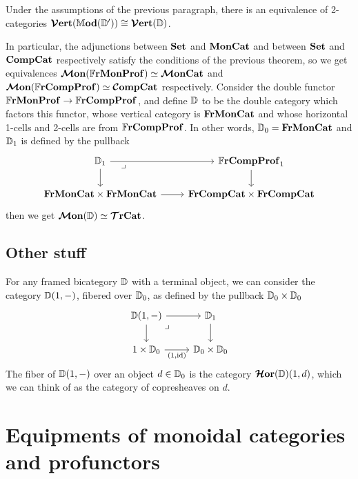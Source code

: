 \documentclass[12pt,oneside,article,draft]{memoir}
\begin{document}
\begin{theorem}\label{thm:Verts}
   Under the assumptions of the previous paragraph, there is an equivalence of 2-categories
   $\bm{\mathcal{V}}\mathbf{ert}(\mathbb{M}\mathbf{od}(\mathbb{D}'))\cong\bm{\mathcal{V}}\mathbf{ert}(\mathbb{D})$.
\end{theorem}

In particular, the adjunctions between $\mathbf{Set}$ and $\mathbf{MonCat}$ and between $\mathbf{Set}$ and $\mathbf{CompCat}$
respectively satisfy the conditions of the previous theorem, so we get equivalences
$\bm{\mathcal{M}}\mathbf{on}(\mathbb{F}\mathbf{rMonProf})\simeq\bm{\mathcal{M}}\mathbf{onCat}$ and $\bm{\mathcal{M}}\mathbf{on}(\mathbb{F}\mathbf{rCompProf})\simeq\bm{\mathcal{C}}\mathbf{ompCat}$ respectively.  Consider
the double functor $\mathbb{F}\mathbf{rMonProf}\to\mathbb{F}\mathbf{rCompProf}$, and define $\mathbb{D}$ to be the double category
which factors this functor, whose vertical category is $\mathbf{FrMonCat}$ and whose horizontal 1-cells and
2-cells are from $\mathbb{F}\mathbf{rCompProf}$.  In other words, $\mathbb{D}_0=\mathbf{FrMonCat}$ and $\mathbb{D}_1$ is defined
by the pullback
\[
   \begin{tikzcd}
      \dcat{D}_1 \ar[r] \ar[d] \ar[dr,phantom,"\lrcorner"very near start]
      & \dFrCompProf_1 \ar[d]
      \\
      \FrMonCat\times\FrMonCat \ar[r]
      & \FrCompCat\times\FrCompCat
   \end{tikzcd}
\]
then we get $\bm{\mathcal{M}}\mathbf{on}(\mathbb{D})\simeq\bm{\mathcal{T}}\mathbf{rCat}$.

\section{Other stuff}

For any framed bicategory $\mathbb{D}$ with a terminal object, we can consider the category
$\mathbb{D}(1,-)$, fibered over $\mathbb{D}_0$, as defined by the pullback $\mathbb{D}_0\times\mathbb{D}_0$
\begin{equation}
   \begin{tikzcd}
      \dcat{D}(1,-) \ar[r] \ar[d] \arrow[dr,phantom,"\lrcorner",very near start]
         & \dcat{D}_1 \ar[d] \\
      1\times\dcat{D}_0 \ar[r,"{(1,\id)}"']
         & \dcat{D}_0\times\dcat{D}_0
   \end{tikzcd}
\end{equation}
The fiber of $\mathbb{D}(1,-)$ over an object $d\in\mathbb{D}_0$ is the category $\bm{\mathcal{H}}\mathbf{or}(\mathbb{D})(1,d)$,
which we can think of as the category of copresheaves on $d$.


\chapter{Equipments of monoidal categories and profunctors}
\end{document}
